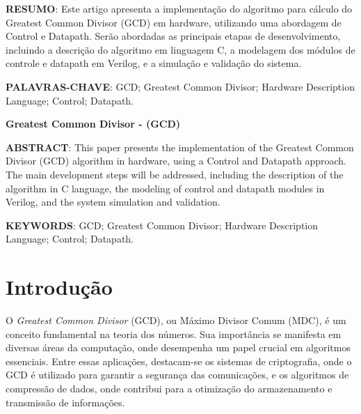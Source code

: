\documentclass[a4paper,11pt]{article} %
\begin{document}


\begin{center}
    \tableofcontents %
\end{center}

\newpage


\vspace{0.5cm}
\noindent\textbf{RESUMO}:
Este artigo apresenta a implementação do algoritmo para cálculo do
Greatest Common Divisor (GCD) em hardware,
utilizando uma abordagem de Control e Datapath.
Serão abordadas as principais etapas de desenvolvimento,
incluindo a descrição do algoritmo em linguagem C,
a modelagem dos módulos de controle e datapath em Verilog,
e a simulação e validação do sistema.

\vspace{0.5cm}
\noindent\textbf{PALAVRAS-CHAVE}:
GCD; Greatest Common Divisor; Hardware Description Language; Control; Datapath.

\vspace{0.5cm}
\begin{center}
    \textbf{Greatest Common Divisor - (GCD)}
\end{center}

\noindent\textbf{ABSTRACT}:
This paper presents the implementation of the Greatest Common Divisor (GCD)
algorithm in hardware, using a Control and Datapath approach.
The main development steps will be addressed,
including the description of the algorithm in C language,
the modeling of control and datapath modules in Verilog,
and the system simulation and validation.

\vspace{0.5cm}
\noindent\textbf{KEYWORDS}: GCD; Greatest Common Divisor; Hardware Description Language; Control; Datapath.

\section{Introdução}

O \textit{Greatest Common Divisor} (GCD), ou Máximo Divisor Comum (MDC), é um conceito fundamental na teoria dos números. Sua importância se manifesta em diversas áreas da computação, onde desempenha um papel crucial em algoritmos essenciais. Entre essas aplicações, destacam-se os sistemas de criptografia, onde o GCD é utilizado para garantir a segurança das comunicações, e os algoritmos de compressão de dados, onde contribui para a otimização do armazenamento e transmissão de informações.
\end{document}
